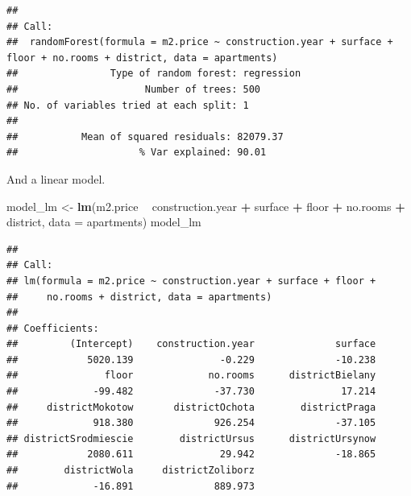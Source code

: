 \documentclass[]{krantz}
\newenvironment{Shaded}{\begin{snugshade}}{\end{snugshade}}
\newcommand{\DataTypeTok}[1]{\textcolor[rgb]{0.13,0.29,0.53}{#1}}
\newcommand{\KeywordTok}[1]{\textcolor[rgb]{0.13,0.29,0.53}{\textbf{#1}}}
\newcommand{\NormalTok}[1]{#1}
\newcommand{\OperatorTok}[1]{\textcolor[rgb]{0.81,0.36,0.00}{\textbf{#1}}}
\newcommand{\StringTok}[1]{\textcolor[rgb]{0.31,0.60,0.02}{#1}}
\theoremstyle{definition}
\theoremstyle{definition}
\theoremstyle{definition}
\theoremstyle{remark}
\begin{document}
\begin{verbatim}
## 
## Call:
##  randomForest(formula = m2.price ~ construction.year + surface +      floor + no.rooms + district, data = apartments) 
##                Type of random forest: regression
##                      Number of trees: 500
## No. of variables tried at each split: 1
## 
##           Mean of squared residuals: 82079.37
##                     % Var explained: 90.01
\end{verbatim}

And a linear model.

\begin{Shaded}
\begin{Highlighting}[]
\NormalTok{model_lm <-}\StringTok{ }\KeywordTok{lm}\NormalTok{(m2.price }\OperatorTok{~}\StringTok{ }\NormalTok{construction.year }\OperatorTok{+}\StringTok{ }\NormalTok{surface }\OperatorTok{+}\StringTok{ }\NormalTok{floor }\OperatorTok{+}\StringTok{ }\NormalTok{no.rooms }\OperatorTok{+}\StringTok{ }\NormalTok{district, }\DataTypeTok{data =}\NormalTok{ apartments)}
\NormalTok{model_lm}
\end{Highlighting}
\end{Shaded}

\begin{verbatim}
## 
## Call:
## lm(formula = m2.price ~ construction.year + surface + floor + 
##     no.rooms + district, data = apartments)
## 
## Coefficients:
##         (Intercept)    construction.year              surface  
##            5020.139               -0.229              -10.238  
##               floor             no.rooms      districtBielany  
##             -99.482              -37.730               17.214  
##     districtMokotow       districtOchota        districtPraga  
##             918.380              926.254              -37.105  
## districtSrodmiescie        districtUrsus      districtUrsynow  
##            2080.611               29.942              -18.865  
##        districtWola     districtZoliborz  
##             -16.891              889.973
\end{verbatim}


\end{document}
